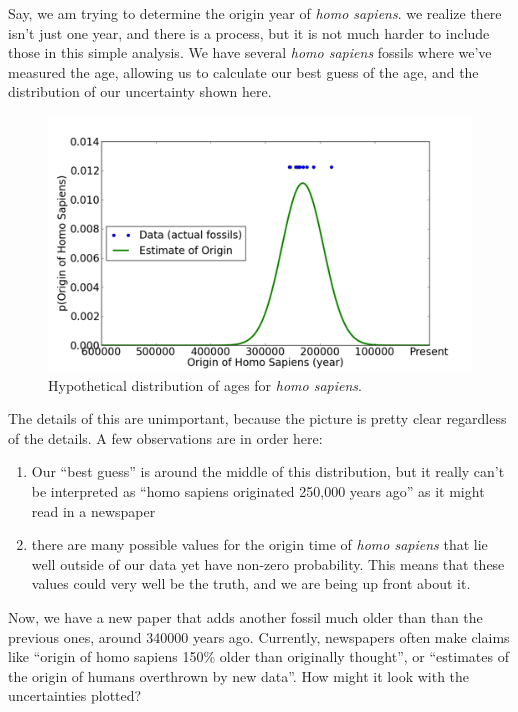 Say, we am trying to determine the origin year of {\em homo sapiens}. we realize there isn't just one year, and there is a process, but it is not much harder to include those in this simple analysis.  We have several {\em homo sapiens} fossils where we've measured the age, allowing us to
calculate our best guess of the age, and the distribution of our
uncertainty shown here.

\begin{figure}[htbp]
\centering
\includegraphics{img/blah2-2011-01-29-11-35.png}
\caption{Hypothetical distribution of ages for {\em homo sapiens}.}
\end{figure}

The details of this are unimportant, because the picture is pretty clear regardless of the details.  A few observations are in order here:

\begin{enumerate}
\def\labelenumi{\arabic{enumi}.}
\itemsep1pt\parskip0pt
\item
  Our ``best guess'' is around the middle of this distribution, but it
  really can't be interpreted as ``homo sapiens originated 250,000 years
  ago'' as it might read in a newspaper
\item
  there are many possible values for the origin time of {\em homo sapiens} that lie well outside of our data yet have non-zero probability.  This means that these values could very well be the truth, and we are being up front about it.
\end{enumerate}

Now, we have a new paper that adds another fossil much older than than
the previous ones, around 340000 years ago. Currently, newspapers often make claims like ``origin of homo sapiens 150\% older than originally thought'', or ``estimates of the origin of humans overthrown by new data''. How might it look with the uncertainties plotted?

